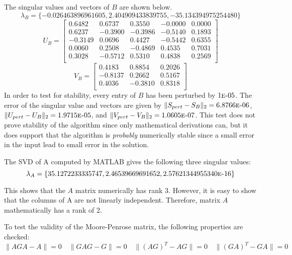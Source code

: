 \documentclass[letterpaper,12pt,]{article}
\begin{document}
The singular values and vectors of $B$ are shown below.
\begin{equation*}
\lambda_B = \{-0.026463896961605, 2.404909433839755, -35.134394975254480\}
\end{equation*}
\begin{equation*}
U_B = 
\begin{bmatrix}
    0.6482 &  0.6737 &  0.3550 & -0.0000 &  0.0000\\
    0.6237 & -0.3900 & -0.3986 & -0.5140 &  0.1893\\
   -0.3149 &  0.0696 &  0.4427 & -0.5442 &  0.6355\\
    0.0060 &  0.2508 & -0.4869 &  0.4535 &  0.7031\\
    0.3028 & -0.5712 &  0.5310 &  0.4838 &  0.2569\\
\end{bmatrix}
\end{equation*}
\begin{equation*}
V_B = 
\begin{bmatrix}
    0.4183 &  0.8854 &  0.2026\\
   -0.8137 &  0.2662 &  0.5167\\
    0.4036 & -0.3810 &  0.8318\\
\end{bmatrix}
\end{equation*}
In order to test for stability, every entry of $B$ has been perturbed by $1\textsc{e-}05$. The error of the singular value and vectors are given by $\|S_{pert}-S_{B}\|_2=6.8766\textsc{e-}06$, $\|U_{pert}-U_{B}\|_2=1.9715\textsc{e-}05$, and $\|V_{pert}-V_{B}\|_2=1.0605\textsc{e-}07$. This test does not prove stability of the algorithm since only mathematical derivations can, but it does support that the algorithm is \emph{probably} numerically stable since a small error in the input lead to small error in the solution.

The SVD of A computed by MATLAB gives the following three singular values:
\begin{equation*}
\lambda_A = \{35.1272233335747, 2.46539669691652, 2.57621344955340\textsc{e-}16 \}
\end{equation*}

This shows that the $A$ matrix numerically has rank 3. However, it is easy to show that the columns of A are not linearly independent. Therefore, matrix $A$ mathematically has a rank of 2.

To test the validity of the Moore-Penrose matrix, the following properties are checked:
\begin{equation*}
\|AGA - A\| = 0 \quad 
\|GAG - G\| = 0 \quad 
\|(AG)^T - AG\| = 0 \quad 
\|(GA)^T - GA\| = 0
\end{equation*}
\end{document}
